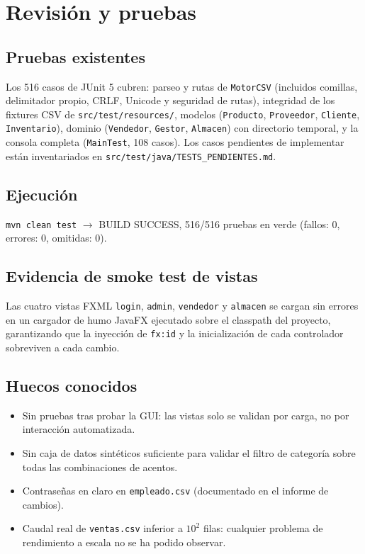 \chapter{Revisión y pruebas}

\section{Pruebas existentes}
Los 516 casos de JUnit 5 cubren: parseo y rutas de \texttt{MotorCSV} (incluidos comillas, delimitador propio, CRLF, Unicode y seguridad de rutas), integridad de los fixtures CSV de \texttt{src/test/resources/}, modelos (\texttt{Producto}, \texttt{Proveedor}, \texttt{Cliente}, \texttt{Inventario}), dominio (\texttt{Vendedor}, \texttt{Gestor}, \texttt{Almacen}) con directorio temporal, y la consola completa (\texttt{MainTest}, 108 casos). Los casos pendientes de implementar están inventariados en \texttt{src/test/java/TESTS\_PENDIENTES.md}.

\section{Ejecución}
\begin{techbox}
\texttt{mvn clean test} $\rightarrow$ BUILD SUCCESS, 516/516 pruebas en verde (fallos: 0, errores: 0, omitidas: 0).
\end{techbox}

\section{Evidencia de smoke test de vistas}
Las cuatro vistas FXML \texttt{login}, \texttt{admin}, \texttt{vendedor} y \texttt{almacen} se cargan sin errores en un cargador de humo JavaFX ejecutado sobre el classpath del proyecto, garantizando que la inyección de \texttt{fx:id} y la inicialización de cada controlador sobreviven a cada cambio.

\section{Huecos conocidos}
\begin{itemize}
\item Sin pruebas tras probar la GUI: las vistas solo se validan por carga, no por interacción automatizada.
\item Sin caja de datos sintéticos suficiente para validar el filtro de categoría sobre todas las combinaciones de acentos.
\item Contraseñas en claro en \texttt{empleado.csv} (documentado en el informe de cambios).
\item Caudal real de \texttt{ventas.csv} inferior a $10^2$ filas: cualquier problema de rendimiento a escala no se ha podido observar.
\end{itemize}
